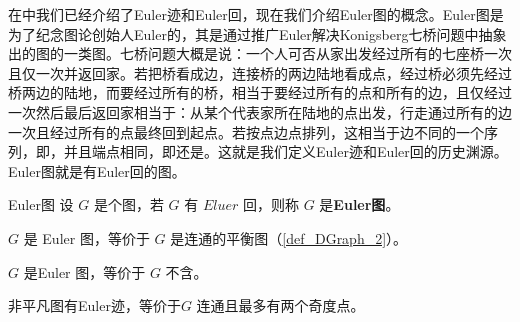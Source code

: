 
\cite{graph2}在中我们已经介绍了Euler迹和Euler回，现在我们介绍Euler图的概念。Euler图是为了纪念图论创始人Euler的，其是通过推广Euler解决Konigsberg七桥问题中抽象出的图的一类图。七桥问题大概是说：一个人可否从家出发经过所有的七座桥一次且仅一次并返回家。若把桥看成边，连接桥的两边陆地看成点，经过桥必须先经过桥两边的陆地，而要经过所有的桥，相当于要经过所有的点和所有的边，且仅经过一次然后最后返回家相当于：从某个代表家所在陆地的点出发，行走通过所有的边一次且经过所有的点最终回到起点。若按点边点排列，这相当于边不同的一个序列，即，并且端点相同，即还是。这就是我们定义Euler迹和Euler回的历史渊源。Euler图就是有Euler回的图。

\begin{definition}{Euler图}
设 $G$ 是个图，若 $G$ 有 $Eluer$ 回，则称 $G$ 是\textbf{Euler图}。
\end{definition}



\begin{theorem}{}
$G$ 是 Euler 图，等价于 $G$ 是连通的平衡图（\autoref{def_DGraph_2}）。
\end{theorem}





\begin{corollary}{}
$G$ 是Euler 图，等价于 $G$ 不含。
\end{corollary}


\begin{corollary}{}
非平凡图有Euler迹，等价于$G$ 连通且最多有两个奇度点。
\end{corollary}







